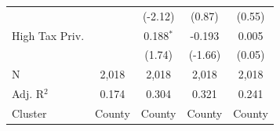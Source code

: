 \begin{tabular*}{\textwidth}{@{\extracolsep{\fill}}lcccc}
                              &               & (-2.12)        & (0.87)       & (0.55)\\   
   High Tax Priv.             &               & 0.188$^{*}$    & -0.193        & 0.005\\   
                              &               & (1.74)         & (-1.66)       & (0.05)\\   
   \hline
   N               & 2,018         & 2,018          & 2,018         & 2,018\\  
   Adj. R$^2$             & 0.174         & 0.304          & 0.321         & 0.241\\  
   Cluster              & County & County & County & County\\  
   \bottomrule
\end{tabular*}
\par\endgroup
